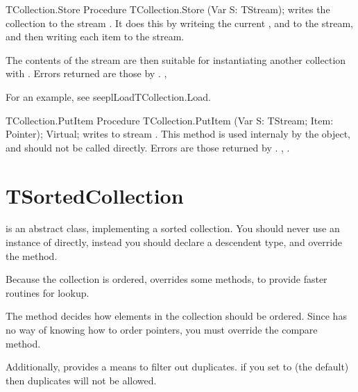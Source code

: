 \html{}

\begin{procedure}{TCollection.Store}
\Declaration
Procedure TCollection.Store (Var S: TStream);
\Description
{} writes the collection to the stream . It does
this by writeing the current ,  and 
to the stream, and then writing each item to the stream.

The contents of the stream are then suitable for instantiating another
collection with .
\Errors
Errors returned are those by .
\SeeAlso
{}, 
\end{procedure}

For an example, see seepl{Load}{TCollection.Load}.

\begin{procedure}{TCollection.PutItem}
\Declaration
Procedure TCollection.PutItem (Var S: TStream; Item: Pointer); Virtual;
\Description
{} writes  to stream . This method is used
internaly by the  object, and should not be called
directly.
\Errors
Errors are those returned by .
\SeeAlso
{}, .
\end{procedure}

\section{TSortedCollection}
\label{se:TSortedCollection}

 is an abstract class, implementing a sorted
collection. You should never use an instance of 
directly, instead you should declare a descendent type, and override the
 method.

Because the collection is ordered,  overrides some
 methods, to provide faster routines for lookup.

The  method decides how elements 
in the collection should be ordered. Since  has no way
of knowing how to order pointers, you must override the compare method.

Additionally,  provides a means to filter out duplicates.
if you set  to  (the default) then duplicates
will not be allowed.

